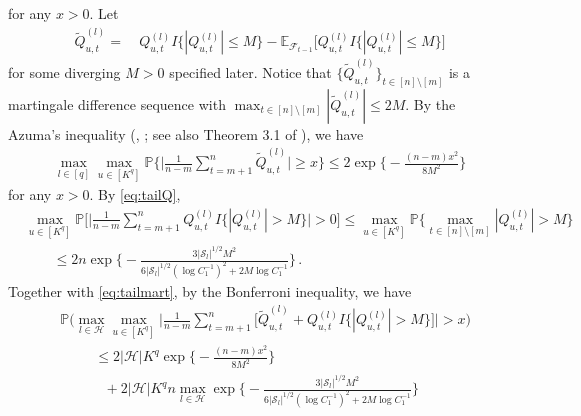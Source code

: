 \documentclass[12pt]{article}
\newcommand{\btheta}{\boldsymbol \theta}
\newcommand{\0}{{\bf 0}}
\begin{document}
for any $x>0$. Let
\begin{align*}
\tilde{Q}_{u,t}^{(l)}=&~Q_{u,t}^{(l)}I\big\{|Q_{u,t}^{(l)}|\leq M\big\}-\mathbb{E}_{\mathcal{F}_{t-1}}\big[Q_{u,t}^{(l)}I\big\{|Q_{u,t}^{(l)}|\leq M\big\}\big]%
\end{align*}
for some diverging $M>0$ specified later. Notice that $\{\tilde{Q}_{u,t}^{(l)}\}_{t\in[n]\setminus[m]}$ is a martingale difference sequence with $\max_{t\in[n]\setminus[m]}|\tilde{Q}_{u,t}^{(l)}|\leq 2M$. By the Azuma's inequality (\citeauthor{Azuma1967_supp}, \citeyear{Azuma1967_supp}; 
see also Theorem 3.1 of  \cite{Lesigne2001_supp}), 
we have
\begin{align}\label{eq:tailmart}
\max_{l\in[q]}\max_{u\in[K^q]}\mathbb{P}\bigg\{\bigg|\frac{1}{n-m}\sum_{t=m+1}^n\tilde{Q}_{u,t}^{(l)}\bigg|\geq x\bigg\}\leq 2\exp\bigg\{-\frac{(n-m)x^2}{8M^2}\bigg\}
\end{align}
for any $x>0$. By \eqref{eq:tailQ}, 
\begin{align*}
&\max_{u\in[K^q]}\mathbb{P}\bigg[\bigg|\frac{1}{n-m}\sum_{t=m+1}^nQ_{u,t}^{(l)}I\big\{|Q_{u,t}^{(l)}|>M\big\}\bigg|>0\bigg]\leq \max_{u\in[K^q]}\mathbb{P}\bigg\{\max_{t\in[n]\setminus[m]}|Q_{u,t}^{(l)}|>M\bigg\}\\
&~~~~~~~~~\leq 2n\exp\bigg\{-\frac{3|\mathcal{S}_l|^{1/2}M^2}{6|\mathcal{S}_l|^{1/2}(\log C_1^{-1})^2+2M\log C_1^{-1}}\bigg\}\,.
\end{align*}
Together with \eqref{eq:tailmart}, by the Bonferroni inequality, we have
\begin{align*}
&\mathbb{P}\bigg(\max_{l\in\mathcal{H}}\max_{u\in[K^q]}\bigg|\frac{1}{n-m}\sum_{t=m+1}^n\big[\tilde{Q}_{u,t}^{(l)}+Q_{u,t}^{(l)}I\big\{|Q_{u,t}^{(l)}|>M\big\}\big]\bigg|>x\bigg)\\
&~~~~~~~~~~~\leq 2|\mathcal{H}|K^q\exp\bigg\{-\frac{(n-m)x^2}{8M^2}\bigg\}\\
&~~~~~~~~~~~~~~+2|\mathcal{H}|K^qn\max_{l\in\mathcal{H}}\exp\bigg\{-\frac{3|\mathcal{S}_l|^{1/2}M^2}{6|\mathcal{S}_l|^{1/2}(\log C_1^{-1})^2+2M\log C_1^{-1}}\bigg\}
\end{align*}
\end{document}
